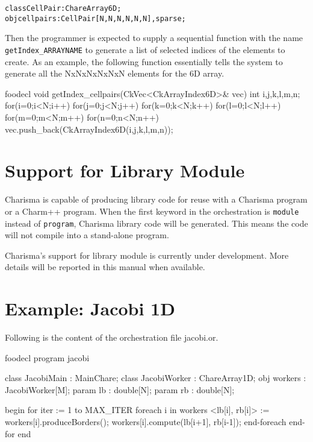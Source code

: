 \documentclass[10pt]{article}
\def\smallfbox#1{{\small \fbox{#1}}}
\def\code#1{{\small {\tt {#1}}}}
\begin{document}
\begin{alltt}
    class CellPair : ChareArray6D;	
    obj cellpairs : CellPair[N,N,N,N,N,N],sparse; 
\end{alltt}

Then the programmer is expected to supply a sequential function with the name
\code{getIndex\_ARRAYNAME} to generate a list of selected indices of the
elements to create. As an example, the following function essentially tells the
system to generate all the NxNxNxNxNxN elements for the 6D array. 

\begin{SaveVerbatim}{foodecl}
void getIndex_cellpairs(CkVec<CkArrayIndex6D>& vec){
  int i,j,k,l,m,n;
  for(i=0;i<N;i++)
    for(j=0;j<N;j++)
      for(k=0;k<N;k++)
        for(l=0;l<N;l++)
          for(m=0;m<N;m++)
            for(n=0;n<N;n++)
              vec.push_back(CkArrayIndex6D(i,j,k,l,m,n));
}
\end{SaveVerbatim}
\vspace{0.1in}
\smallfbox{\BUseVerbatim{foodecl}}
\vspace{0.1in}


\section{Support for Library Module}
\label{sec:module}

Charisma is capable of producing library code for reuse with a Charisma program
or a Charm++ program. When the first keyword in the orchestration is
\code{module} instead of \code{program}, Charisma library code will be
generated. This means the code will not compile into a stand-alone program.

Charisma's support for library module is currently under development. More
details will be reported in this manual when available.

\appendix
\label{sec:appendix}

\section{Example: Jacobi 1D}
Following is the content of the orchestration file jacobi.or. 

\begin{SaveVerbatim}{foodecl}
program jacobi

class  JacobiMain : MainChare;
class  JacobiWorker : ChareArray1D;
obj  workers : JacobiWorker[M];
param  lb : double[N];
param  rb : double[N];

begin
    for iter := 1 to MAX_ITER
	foreach i in workers
	    <lb[i], rb[i]> := workers[i].produceBorders();
	    workers[i].compute(lb[i+1], rb[i-1]);
	end-foreach
    end-for
end
\end{SaveVerbatim}
\vspace{0.1in}
\smallfbox{\BUseVerbatim{foodecl}}
\vspace{0.1in}
\end{document}
